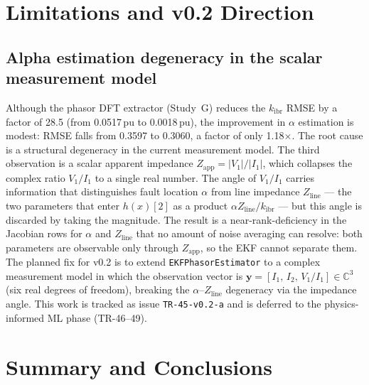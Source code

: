 \documentclass[11pt,a4paper]{article}
\newcommand{\kibr}{k_\mathrm{ibr}}
\begin{document}
\section{Limitations and v0.2 Direction}
\label{sec:limitations}

\subsection*{Alpha estimation degeneracy in the scalar measurement model}

Although the phasor DFT extractor (Study~G) reduces the $\kibr$ RMSE by a
factor of 28.5 (from 0.0517\,pu to 0.0018\,pu), the improvement in $\alpha$
estimation is modest: RMSE falls from 0.3597 to 0.3060, a factor of only
1.18$\times$.  The root cause is a structural degeneracy in the current
measurement model.  The third observation is a scalar apparent impedance
$Z_\mathrm{app} = |V_1|/|I_1|$, which collapses the complex ratio
$V_1/I_1$ to a single real number.  The angle of $V_1/I_1$ carries
information that distinguishes fault location $\alpha$ from line impedance
$Z_\mathrm{line}$ — the two parameters that enter $h(x)[2]$ as a product
$\alpha Z_\mathrm{line}/\kibr$ — but this angle is discarded by taking the
magnitude.  The result is a near-rank-deficiency in the Jacobian rows for
$\alpha$ and $Z_\mathrm{line}$ that no amount of noise averaging can resolve:
both parameters are observable only through $Z_\mathrm{app}$, so the EKF
cannot separate them.  The planned fix for v0.2 is to extend
\texttt{EKFPhasorEstimator} to a complex measurement model in which the
observation vector is $\mathbf{y} = [I_1,\, I_2,\, V_1/I_1] \in \mathbb{C}^3$
(six real degrees of freedom), breaking the $\alpha$--$Z_\mathrm{line}$
degeneracy via the impedance angle.  This work is tracked as issue
\texttt{TR-45-v0.2-a} and is deferred to the physics-informed ML phase
(TR-46--49).

\section{Summary and Conclusions}
\label{sec:summary}
\end{document}
